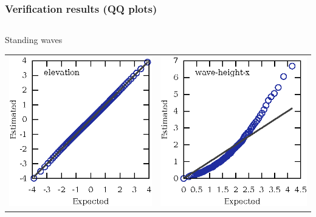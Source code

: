 \documentclass[14pt,aspectratio=169]{beamer}
\begin{document}
	\begin{frame}
		\frametitle{Verification results (QQ plots)}
		\small%
		\centering
		\begin{columns}
			\begin{column}{0.5\textwidth}
				\centering%
				Standing waves
				\begin{tabular}{ll}
					\includegraphics[scale=0.5]{standing-elevation} &
					\includegraphics[scale=0.5]{standing-wave-height-x} \\

\end{tabular}
\end{column}
\end{columns}
\end{frame}
\end{document}
